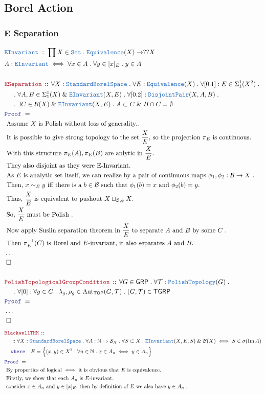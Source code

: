 \documentclass[12pt]{scrartcl}
\newcommand{\TYPE}[1]{\textcolor{NavyBlue}{\mathtt{#1}}}
\newcommand{\LOGIC}[1]{\textcolor{Blue}{\mathtt{#1}}}
\newcommand{\THM}[1]{\textcolor{Maroon}{\mathtt{#1}}}
\renewcommand{\.}{\; . \;}
\newcommand{\where}{\LOGIC{where}}
\newcommand{\Theorem}[2]{& \THM{#1} \, :: \, #2 \\ & \Proof = \\ }
\newcommand{\DeclareType}[2]{& \TYPE{#1} \, :: \, #2 \\}
\newcommand{\DefineType}[3]{& #1 : \TYPE{#2} \iff #3 \\}
\newcommand{\NewLine}{\\ & \kern 1pc}
\newcommand{\Page}[1]{ \begin{align*} #1 \end{align*}   }
\newcommand{\NoProof}{ & \ldots \\ \EndProof}
\renewcommand{\And}{\; \& \;}
\newcommand{\Nat}{\mathbb{N} }
\DeclareMathOperator*{\im}{Im}
\newcommand{\Eq}{\TYPE{Equivalence}}
\newcommand{\Aut}{\mathrm{Aut}}
\newcommand{\Set}{\TYPE{Set}}
\newcommand{\Explain}[1]{& \text{#1.} \\}
\newcommand{\QED}{\; \square}
\newcommand{\EndProof}{& \QED \\}
\newcommand{\Proof}{\LOGIC{Proof} \; }
\newcommand{\B}{\mathcal{B}}
\newcommand{\TOP}{\mathsf{TOP}}
\newcommand{\T}{\mathcal{T}}
\newcommand{\SBS}{\TYPE{StandardBorelSpace}}
\renewcommand{\S}{\mathcal{S}}
\newcommand{\GRP}{\mathsf{GRP}}
\newcommand{\TGRP}{\mathsf{TGRP}}
\renewcommand{\S}{\mathcal{S}}
\begin{document}
\subsection{Borel Action}
\subsubsection{E Separation}
\Page{
	\DeclareType{EInvariant}
	{
		\prod X \in \Set \.
		\Eq(X) \to ??X
	}
	\DefineType{A}{EInvariant}
	{
		\forall x \in A \. \forall y \in [x]_E \. y \in A
	}
	\\
	\Theorem{ESeparation}
	{
		\forall X : \SBS \.
		\forall E : \Eq(X) \.
		\forall [0.1] : E \in \Sigma^1_1(X^2) \. \NewLine \.
		\forall A,B \in \Sigma^1_1(X) \And \TYPE{EInvariant}(X,E) \.
		\forall [0.2] : \TYPE{DisjointPair}(X,A,B) \. \NewLine \.
		\exists C \in \B(X) \And \TYPE{EInvariant}(X,E) \.
		A \subset C \And B \cap C = \emptyset
	}
	\Explain{ Assume $X$ is Polish without loss of generality.}
	\Explain{ It is possible to give strong topology to the set $\frac{X}{E}$, 
		so the projection $\pi_E$ is continuous}
	\Explain{ With this structure $\pi_E(A),\pi_E(B)$ are anlytic in $\frac{X}{E}$}
	\Explain{ They also disjoint as they were E-Invariant}
	\Explain{ As $E$ is analytic set itself, we can realize by a pair of continuous maps 
		  $\phi_1,\phi_2 : \B \to X$ }
	\Explain{ Then, $x \sim_E y$ iff there is a $b \in \B$ such that $\phi_1(b) = x$ and $\phi_2(b)=y$}
	\Explain{ Thus, $\frac{X}{E}$ is equivalent to pushout $X \sqcup_{\B,\phi} X$}
	\Explain{ So, $\frac{X}{E}$ must be Polish }
	\Explain{ Now apply Suslin separation theorem in $\frac{X}{E}$ to separate
		$A$ and $B$ by some $C$ }
	\Explain{ Then $\pi_E^{-1}(C)$ is Borel and $E$-invariant, it also separates $A$ and $B$}
	\NoProof
	\\
	\Theorem{PolishTopologicalGroupCondition}
	{
		\forall G \in \GRP \.
		\forall \T : \TYPE{PolishTopology}(G) \. \NewLine \.
		\forall [0] : \forall g \in G \. \lambda_g, \rho_g \in \Aut_\TOP(G,\T) \.
		(G,\T) \in \TGRP
	}
	\NoProof
}\Page{
	\Theorem{BlackwellTHM}
	{
		\NewLine ::		
		\forall X : \SBS \.
		\forall A : \Nat \to \S_X \.
		\forall S \subset X \.
		\TYPE{EInvariant}(X,E,S) \And \B(X)
		\iff
		S \in \sigma(\im A)
		\NewLine
		\where \quad
		E =  \Big\{ (x,y) \in X^2 :  \forall n \in \Nat \. x \in A_n \iff y \in A_n  \Big\}			
	}
	\Explain{ By properties of logical $\iff$ it is obvious that $E$ is equivalence}
	\Explain{ Firstly, we show that each $A_n$ is $E$-invariant}
	\Explain{ consider $x \in A_n$ and $y \in [x]_E$, then by definition of $E$ we also have $y \in A_n$ }
}
\end{document}
